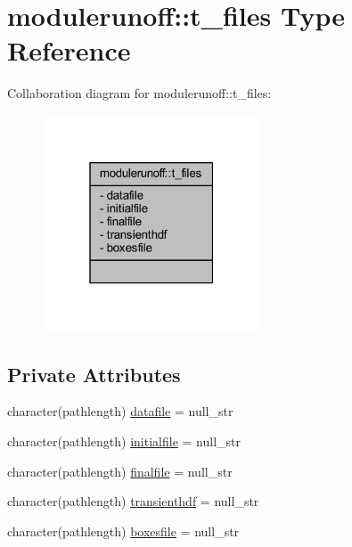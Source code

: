 \hypertarget{structmodulerunoff_1_1t__files}{}\section{modulerunoff\+:\+:t\+\_\+files Type Reference}
\label{structmodulerunoff_1_1t__files}


Collaboration diagram for modulerunoff\+:\+:t\+\_\+files\+:\nopagebreak
\begin{figure}[H]
\begin{center}
\leavevmode
\includegraphics[width=183pt]{structmodulerunoff_1_1t__files__coll__graph}
\end{center}
\end{figure}
\subsection*{Private Attributes}
\begin{DoxyCompactItemize}
\item 
character(pathlength) \mbox{\hyperlink{structmodulerunoff_1_1t__files_a880232c7082b461adc6c5274ad2fe644}{datafile}} = null\+\_\+str
\item 
character(pathlength) \mbox{\hyperlink{structmodulerunoff_1_1t__files_a8b4ccdef7b38556c737142dac5ccc9a1}{initialfile}} = null\+\_\+str
\item 
character(pathlength) \mbox{\hyperlink{structmodulerunoff_1_1t__files_a904f87b9e374cf73e6370dc820682938}{finalfile}} = null\+\_\+str
\item 
character(pathlength) \mbox{\hyperlink{structmodulerunoff_1_1t__files_a96879f0959c7c108ebcef0231509c8d1}{transienthdf}} = null\+\_\+str
\item 
character(pathlength) \mbox{\hyperlink{structmodulerunoff_1_1t__files_accaf3d262564a59a20c59880cb2c588b}{boxesfile}} = null\+\_\+str
\end{DoxyCompactItemize}


